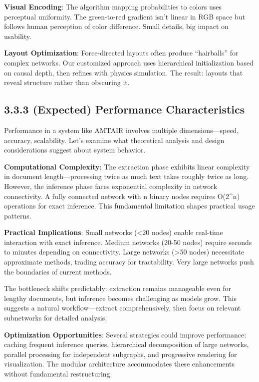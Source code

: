 \documentclass[
  11pt,
  letterpaper,
]{book}
\begin{document}
\textbf{Visual Encoding}: The algorithm mapping probabilities to colors
uses perceptual uniformity. The green-to-red gradient isn't linear in
RGB space but follows human perception of color difference. Small
details, big impact on usability.

\textbf{Layout Optimization}: Force-directed layouts often produce
``hairballs'' for complex networks. Our customized approach uses
hierarchical initialization based on causal depth, then refines with
physics simulation. The result: layouts that reveal structure rather
than obscuring it.

\subsection{3.3.3 (Expected) Performance
Characteristics}\label{sec-performance}

Performance in a system like AMTAIR involves multiple
dimensions---speed, accuracy, scalability. Let's examine what
theoretical analysis and design considerations suggest about system
behavior.

\textbf{Computational Complexity}: The extraction phase exhibits linear
complexity in document length---processing twice as much text takes
roughly twice as long. However, the inference phase faces exponential
complexity in network connectivity. A fully connected network with n
binary nodes requires O(2\^{}n) operations for exact inference. This
fundamental limitation shapes practical usage patterns.

\textbf{Practical Implications}: Small networks (\textless20 nodes)
enable real-time interaction with exact inference. Medium networks
(20-50 nodes) require seconds to minutes depending on connectivity.
Large networks (\textgreater50 nodes) necessitate approximate methods,
trading accuracy for tractability. Very large networks push the
boundaries of current methods.

The bottleneck shifts predictably: extraction remains manageable even
for lengthy documents, but inference becomes challenging as models grow.
This suggests a natural workflow---extract comprehensively, then focus
on relevant subnetworks for detailed analysis.

\textbf{Optimization Opportunities}: Several strategies could improve
performance: caching frequent inference queries, hierarchical
decomposition of large networks, parallel processing for independent
subgraphs, and progressive rendering for visualization. The modular
architecture accommodates these enhancements without fundamental
restructuring.
\end{document}
